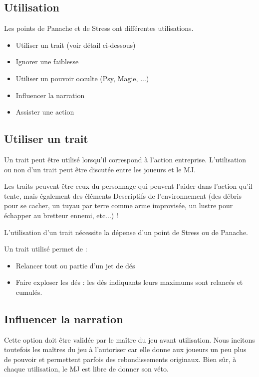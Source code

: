\begin{multicols}{2}
\subsection{Utilisation}

Les points de Panache et de Stress ont différentes utilisations.

\begin{itemize}
\item Utiliser un trait (voir détail ci-dessous)
\item Ignorer une faiblesse
\item Utiliser un pouvoir occulte (Psy, Magie, ...)
\item Influencer la narration
\item Assister une action
\end{itemize}

\subsection{Utiliser un trait}

Un trait peut être utilisé lorsqu'il correspond à l'action entreprise. L'utilisation ou non d'un trait peut être discutée entre les joueurs et le MJ.

Les traits peuvent être ceux du personnage qui peuvent l'aider dans l'action qu'il tente, mais également des éléments Descriptifs de l'environnement (des débris pour se cacher, un tuyau par terre comme arme improvisée, un lustre pour échapper au bretteur ennemi, etc...) !

L'utilisation d'un trait nécessite la dépense d'un point de Stress ou de Panache.

Un trait utilisé permet de :
\begin{itemize}
\item Relancer tout ou partie d'un jet de dés
\item Faire exploser les dés : les dés indiquants leurs maximums sont relancés et cumulés.
\end{itemize}




\subsection{Influencer la narration}

Cette option doit être validée par le maître du jeu avant utilisation. Nous incitons toutefois les maîtres du jeu à l'autoriser car elle donne aux joueurs un peu plus de pouvoir et permettent parfois des rebondissements originaux. Bien sûr, à chaque utilisation, le MJ est libre de donner son véto.


\end{multicols}
